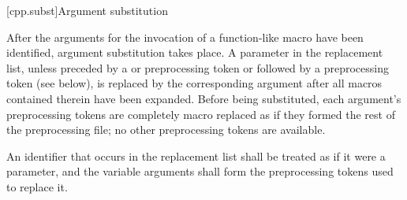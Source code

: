 [cpp.subst]{Argument substitution}%
%
%

\pnum
After the arguments for the invocation of a function-like macro have
been identified, argument substitution takes place.
A parameter in the replacement list, unless preceded by a
\tcode{\#}
or
\tcode{\#\#}
preprocessing token or followed by a
\tcode{\#\#}
preprocessing token (see below),
is replaced by the corresponding argument after all macros
contained therein have been expanded.
Before being substituted,
each argument's preprocessing tokens are completely
macro replaced as if they formed the rest of the
preprocessing file;
no other preprocessing tokens are available.

\pnum
{}%
An identifier  that occurs in the replacement list
shall be treated as if it were a parameter, and the variable arguments shall form
the preprocessing tokens used to replace it.

